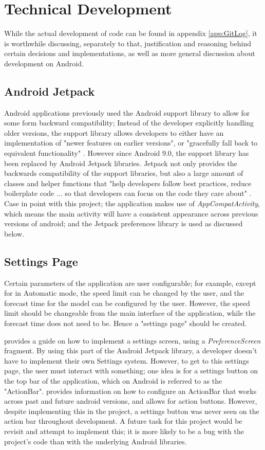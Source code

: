 \documentclass[11pt, a4paper, notitlepage]{report}
\begin{document}
\chapter{Technical Development}
While the actual development of code can be found in appendix \ref{app:GitLog}, it is worthwhile discussing, separately to that, justification and reasoning behind certain decisions and implementations, as well as more general discussion about development on Android.

\section{Android Jetpack}
Android applications previously used the Android support library to allow for some form backward compatibility; Instead of the developer explicitly handling older versions, the support library allows developers to either have an implementation of "newer features on earlier versions", or "gracefully fall back to equivalent functionality" \citep{supportLibAndroid}. However since Android 9.0, the support library has been replaced by Android Jetpack libraries. Jetpack not only provides the backwards compatibility of the support libraries, but also a large amount of classes and helper functions that "help developers follow best practices, reduce boilerplate code ... so that developers can focus on the code they care about" \citep{AndroidJetpack}. Case in point with this project; the application makes use of \textit{AppCompatActivity}, which means the main activity will have a consistent appearance across previous versions of android; and the Jetpack preferences library is used as discussed below.

\section{Settings Page}
Certain parameters of the application are user configurable; for example, except for in Automatic mode, the speed limit can be changed by the user, and the forecast time for the model can be configured by the user. However, the speed limit should be changeable from the main interface of the application, while the forecast time does not need to be. Hence a "settings page" should be created.

\citet{settingsAndroid} provides a guide on how to implement a settings screen, using a \textit{PreferenceScreen} fragment. By using this part of the Android Jetpack library, a developer doesn't have to implement their own Settings system. However, to get to this settings page, the user must interact with something; one idea is for a settings button on the top bar of the application, which on Android is referred to as the "ActionBar". \citet{toolbarAndroid} provides information on how to configure an ActionBar that works across past and future android versions, and allows for action buttons. However, despite implementing this in the project, a settings button was never seen on the action bar throughout development. A future task for this project would be revisit and attempt to implement this; it is more likely to be a bug with the project's code than with the underlying Android libraries.
\end{document}
